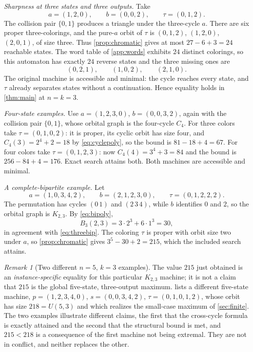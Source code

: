 \documentclass[11pt,a4paper]{article}
\numberwithin{equation}{section}
\theoremstyle{definition}
\theoremstyle{remark}
\newtheorem{remark}[theorem]{Remark}
\begin{document}
\smallskip
\noindent\emph{Sharpness at three states and three outputs.} Take
\begin{equation}\label{eq:n3}
 a=(1,2,0),\qquad b=(0,0,2),\qquad\tau=(0,1,2).
\end{equation}
The collision pair $\{0,1\}$ produces a triangle under the three-cycle $a$.
There are six proper three-colorings, and the pure-$a$ orbit of $\tau$ is
$(0,1,2)$, $(1,2,0)$, $(2,0,1)$, of size three. Thus
\cref{prop:chromatic} gives at most $27-6+3=24$ reachable states. The word
table of \cref{app:words} exhibits $24$ distinct colorings, so this automaton
has exactly $24$ reverse states and the three missing ones are
\[
 (0,2,1),\qquad(1,0,2),\qquad(2,1,0).
\]
The original machine is accessible and minimal: the cycle reaches every
state, and $\tau$ already separates states without a continuation. Hence
equality holds in \cref{thm:main} at $n=k=3$.

\smallskip
\noindent\emph{Four-state examples.} Use $a=(1,2,3,0)$, $b=(0,0,3,2)$, again
with the collision pair $\{0,1\}$, whose orbital graph is the four-cycle
$C_4$. For three colors take $\tau=(0,1,0,2)$: it is proper, its cyclic orbit
has size four, and $C_4(3)=2^4+2=18$ by \eqref{eq:cyclepoly}, so the bound is
$81-18+4=67$. For four colors take $\tau=(0,1,2,3)$: now $C_4(4)=3^4+3=84$
and the bound is $256-84+4=176$. Exact search attains both. Both machines are
accessible and minimal.

\smallskip
\noindent\emph{A complete-bipartite example.} Let
\[
 a=(1,0,3,4,2),\qquad b=(2,1,2,3,0),\qquad\tau=(0,1,2,2,2).
\]
The permutation has cycles $(0\,1)$ and $(2\,3\,4)$, while $b$ identifies $0$
and $2$, so the orbital graph is $K_{2,3}$. By \eqref{eq:bipoly},
\[
 B_3(2,3)=3\cdot2^3+6\cdot1^3=30,
\]
in agreement with \eqref{eq:threebip}. The coloring $\tau$ is proper with
orbit size two under $a$, so \cref{prop:chromatic} gives $3^5-30+2=215$,
which the included search attains.

\begin{remark}[Two different $n=5$, $k=3$ examples]\label{rem:twofives}
The value $215$ just obtained is an \emph{instance-specific} equality for
this particular $K_{2,3}$ machine; it is not a claim that $215$ is the global
five-state, three-output maximum.  lists a different
five-state machine, $p=(1,2,3,4,0)$, $s=(0,0,3,4,2)$, $\tau=(0,1,0,1,2)$,
whose orbit has size $218=U(5,3)$ and which realizes the small-case maximum
of \cref{sec:finite}. The two examples illustrate different claims, the first
that the cross-cycle formula is exactly attained and the second that the
structural bound is met, and $215<218$ is a consequence of the first machine
not being extremal. They are not in conflict, and neither replaces the other.
\end{remark}
\end{document}

